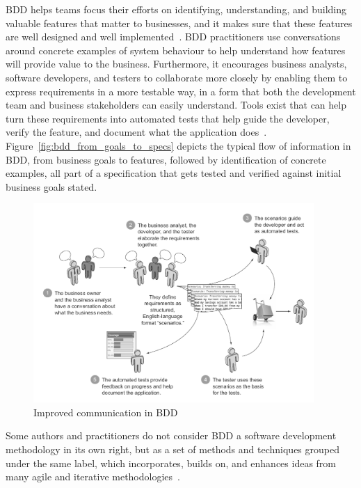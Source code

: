 \documentclass[dissertation,final]{softeng}
\begin{document}
BDD helps teams focus their efforts on identifying, understanding, and building valuable features that matter to businesses, and it makes sure that these features are well designed and well implemented~\citep{Smart201410}. BDD practitioners use conversations around concrete examples of system behaviour to help understand how features will provide value to the business. Furthermore, it encourages business analysts, software developers, and testers to collaborate more closely by enabling them to express requirements in a more testable way, in a form that both the development team and business stakeholders can easily understand. Tools exist that can help turn these requirements into automated tests that help guide the developer, verify the feature, and document what the application does~\citep{Smart201410,wynne2012cucumber}. Figure~\ref{fig:bdd_from_goals_to_specs} depicts the typical flow of information in BDD, from business goals to features, followed by identification of concrete examples, all part of a specification that gets tested and verified against initial business goals stated.

\begin{figure}[h]
\includegraphics[width=0.95\textwidth]{communication_in_bdd}
\centering
\caption[Improved communication in BDD]{Improved communication in BDD~\citep{Smart201410}}
\label{fig:communication_in_bdd}
\end{figure}

Some authors and practitioners do not consider BDD a software development methodology in its own right, but as a set of methods and techniques grouped under the same label, which incorporates, builds on, and enhances ideas from many agile and iterative methodologies~\citep{Smart201410}.
\end{document}
